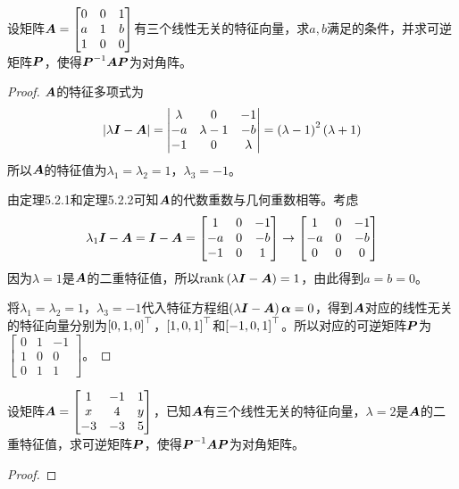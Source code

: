 \begin{problem}
设矩阵\(\boldsymbol{A}=\begin{bmatrix}0&0&1\\a&1&b\\1&0&0\end{bmatrix}\)有三个线性无关的特征向量，求\(a,b\)满足的条件，并求可逆矩阵\(\boldsymbol{P}\)，使得\({\boldsymbol{P}}^{-1}\boldsymbol{A}\boldsymbol{P}\)为对角阵。
\end{problem}
\begin{proof}
    \(\boldsymbol{A}\)的特征多项式为
    \begin{equation*}
        \left|\lambda\boldsymbol{I}-\boldsymbol{A} \right|=\begin{vmatrix}\lambda&0&-1\\-a&\lambda-1&-b\\-1&0&\lambda\end{vmatrix}=\left( \lambda-1 \right)^2\left( \lambda+1 \right)
    \end{equation*}
    所以\(\boldsymbol{A}\)的特征值为\(\lambda_1=\lambda_2=1\)，\(\lambda_3=-1\)。

    由定理5.2.1和定理5.2.2可知\(\boldsymbol{A}\)的代数重数与几何重数相等。考虑
    \begin{equation*}
        \lambda_1\boldsymbol{I}-\boldsymbol{A}=\boldsymbol{I}-\boldsymbol{A}=
        \begin{bmatrix}
            1  & 0 & -1 \\
            -a & 0 & -b \\
            -1 & 0 & 1
        \end{bmatrix}\to
        \begin{bmatrix}
            1  & 0 & -1 \\
            -a & 0 & -b \\
            0  & 0 & 0
        \end{bmatrix}
    \end{equation*}
    因为\(\lambda=1\)是\(\boldsymbol{A}\)的二重特征值，所以\(\mathrm{rank}\left( \lambda\boldsymbol{I}-\boldsymbol{A} \right)=1\)，由此得到\(a=b=0\)。

    将\(\lambda_1=\lambda_2=1\)，\(\lambda_3=-1\)代入特征方程组\(\left( \lambda\boldsymbol{I}-\boldsymbol{A} \right)\boldsymbol{\alpha}=0\)，得到\(\boldsymbol{A}\)对应的线性无关的特征向量分别为\(\left[ 0,1,0 \right]^\top\)，\(\left[ 1,0,1 \right]^\top\)和\(\left[ -1,0,1 \right]^\top\)。所以对应的可逆矩阵\(\boldsymbol{P}\)为\(\begin{bmatrix}0&1&-1\\1&0&0\\0&1&1\end{bmatrix}\)。
\end{proof}

\begin{problem}
设矩阵\(\boldsymbol{A}=\begin{bmatrix}1&-1&1\\x&4&y\\-3&-3&5\end{bmatrix}\)，已知\(\boldsymbol{A}\)有三个线性无关的特征向量，\(\lambda=2\)是\(\boldsymbol{A}\)的二重特征值，求可逆矩阵\(\boldsymbol{P}\)，使得\({\boldsymbol{P}}^{-1}\boldsymbol{A}\boldsymbol{P}\)为对角矩阵。
\end{problem}
\begin{proof}
\end{proof}

